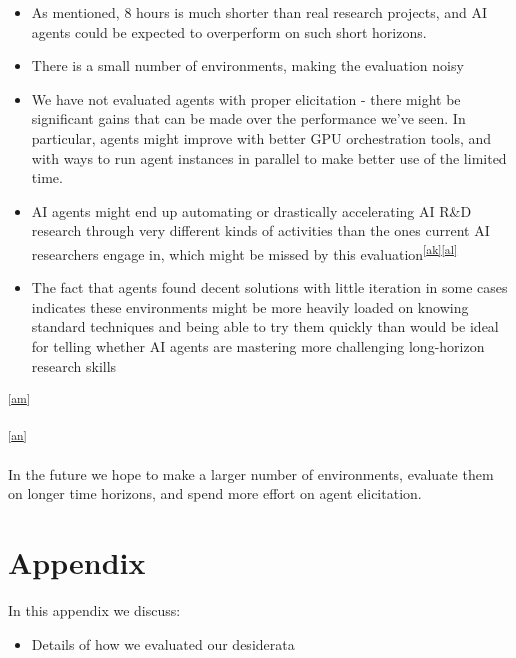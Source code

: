 \documentclass[
]{article}
\providecommand{\tightlist}{%
  \setlength{\itemsep}{0pt}\setlength{\parskip}{0pt}}
\begin{document}
\begin{itemize}
\tightlist
\item
  {As mentioned, 8 hours is much shorter than real research projects,
  and AI agents could be expected to overperform on such short
  horizons.}
\item
  {There is a small number of environments, making the evaluation noisy}
\item
  {We have not evaluated agents with proper elicitation - there might be
  significant gains that can be made over the performance we've seen. In
  particular, agents might improve with better GPU orchestration tools,
  and with ways to run agent instances in parallel to make better use of
  the limited time. }
\item
  {AI agents might end up automating or drastically accelerating AI R\&D
  research through very different kinds of activities than the ones
  current AI researchers engage in, which might be missed by this
  evaluation}\textsuperscript{\label{cmnt_ref37}\hyperref[cmnt37]{{[}ak{]}}\label{cmnt_ref38}\hyperref[cmnt38]{{[}al{]}}}
\item
  {The fact that agents found decent solutions with little iteration in
  some cases indicates these environments might be more heavily loaded
  on knowing standard techniques and being able to try them quickly than
  would be ideal for telling whether AI agents are mastering more
  challenging long-horizon research skills}
\end{itemize}

\textsuperscript{\label{cmnt_ref39}\hyperref[cmnt39]{{[}am{]}}}

{}

\textsuperscript{\label{cmnt_ref40}\hyperref[cmnt40]{{[}an{]}}}

{In the future we hope to make a larger number of environments, evaluate
them on longer time horizons, and spend more effort on agent
elicitation. }

\section{\texorpdfstring{{Appendix}}{Appendix}}\label{h.b46isseautrp}

{In this appendix we discuss:}

\begin{itemize}
\tightlist
\item
  {Details of how we evaluated our desiderata}
\end{itemize}
\end{document}
